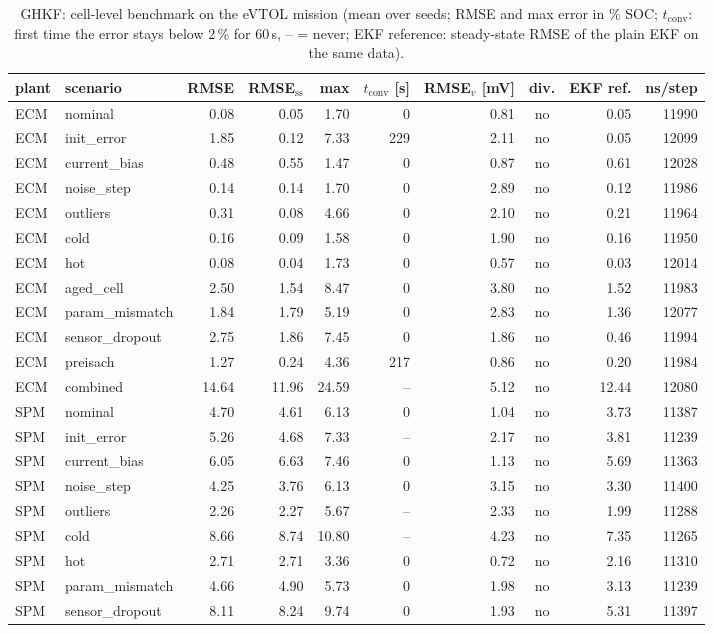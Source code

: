 \begin{table}[H]\centering\footnotesize\setlength{\tabcolsep}{4pt}
\caption{GHKF: cell-level benchmark on the eVTOL mission (mean over seeds; RMSE and max error in \% SOC; $t_\mathrm{conv}$: first time the error stays below 2\,\% for 60\,s, -- = never; EKF reference: steady-state RMSE of the plain EKF on the same data).}\label{tab:cell_GHKF}
\begin{tabular}{llrrrrrcrr}\toprule
plant & scenario & RMSE & RMSE$_\mathrm{ss}$ & max & $t_\mathrm{conv}$ [s] & RMSE$_v$ [mV] & div. & EKF ref. & ns/step \\ \midrule
ECM & nominal & 0.08 & 0.05 & 1.70 & 0 & 0.81 & no & 0.05 & 11990 \\
ECM & init\_error & 1.85 & 0.12 & 7.33 & 229 & 2.11 & no & 0.05 & 12099 \\
ECM & current\_bias & 0.48 & 0.55 & 1.47 & 0 & 0.87 & no & 0.61 & 12028 \\
ECM & noise\_step & 0.14 & 0.14 & 1.70 & 0 & 2.89 & no & 0.12 & 11986 \\
ECM & outliers & 0.31 & 0.08 & 4.66 & 0 & 2.10 & no & 0.21 & 11964 \\
ECM & cold & 0.16 & 0.09 & 1.58 & 0 & 1.90 & no & 0.16 & 11950 \\
ECM & hot & 0.08 & 0.04 & 1.73 & 0 & 0.57 & no & 0.03 & 12014 \\
ECM & aged\_cell & 2.50 & 1.54 & 8.47 & 0 & 3.80 & no & 1.52 & 11983 \\
ECM & param\_mismatch & 1.84 & 1.79 & 5.19 & 0 & 2.83 & no & 1.36 & 12077 \\
ECM & sensor\_dropout & 2.75 & 1.86 & 7.45 & 0 & 1.86 & no & 0.46 & 11994 \\
ECM & preisach & 1.27 & 0.24 & 4.36 & 217 & 0.86 & no & 0.20 & 11984 \\
ECM & combined & 14.64 & 11.96 & 24.59 & -- & 5.12 & no & 12.44 & 12080 \\
\midrule
SPM & nominal & 4.70 & 4.61 & 6.13 & 0 & 1.04 & no & 3.73 & 11387 \\
SPM & init\_error & 5.26 & 4.68 & 7.33 & -- & 2.17 & no & 3.81 & 11239 \\
SPM & current\_bias & 6.05 & 6.63 & 7.46 & 0 & 1.13 & no & 5.69 & 11363 \\
SPM & noise\_step & 4.25 & 3.76 & 6.13 & 0 & 3.15 & no & 3.30 & 11400 \\
SPM & outliers & 2.26 & 2.27 & 5.67 & -- & 2.33 & no & 1.99 & 11288 \\
SPM & cold & 8.66 & 8.74 & 10.80 & -- & 4.23 & no & 7.35 & 11265 \\
SPM & hot & 2.71 & 2.71 & 3.36 & 0 & 0.72 & no & 2.16 & 11310 \\
SPM & param\_mismatch & 4.66 & 4.90 & 5.73 & 0 & 1.98 & no & 3.13 & 11239 \\
SPM & sensor\_dropout & 8.11 & 8.24 & 9.74 & 0 & 1.93 & no & 5.31 & 11397 \\
\bottomrule\end{tabular}\end{table}
